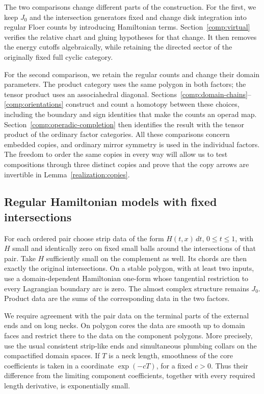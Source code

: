 The two comparisons change different parts of the construction.
For the first, we keep $J_0$ and the intersection generators fixed
and change disk integration into regular Floer counts by introducing
Hamiltonian terms.  Section~\ref{comp:virtual} verifies the relative
chart and gluing hypotheses for that change.  It then removes the
energy cutoffs algebraically, while retaining the directed sector
of the originally fixed full cyclic category.

For the second comparison, we retain the regular counts and change
their domain parameters.  The product category uses the same polygon
in both factors; the tensor product uses an associahedral diagonal.
Sections~\ref{comp:domain-chains}--\ref{comp:orientations} construct
and count a homotopy between these choices, including the boundary
and sign identities that make the counts an operad map.
Section~\ref{comp:operadic-completion} then identifies the result with
the tensor product of the ordinary factor categories.  All these
comparisons concern embedded copies, and ordinary mirror symmetry
is used in the individual factors.  The freedom to order the same
copies in every way will allow us to test compositions through three
distinct copies and prove that the copy arrows are invertible in
Lemma~\ref{realization:copies}.

\subsection{Regular Hamiltonian models with fixed intersections}
\label{comp:regular-models}

For each ordered pair choose strip data of the form $H(t,x)\,dt$,
$0\leq t\leq1$, with $H$ small and identically zero on fixed small
balls around the intersections of that pair.  Take $H$ sufficiently
small on the complement as well.  Its chords are then exactly the
original intersections.  On a stable polygon, with at least two
inputs, use a domain-dependent Hamiltonian one-form whose tangential
restriction to every Lagrangian boundary arc is zero.  The almost
complex structure remains $J_0$.  Product data are the sums of the
corresponding data in the two factors.

We require agreement with the pair data on the terminal parts of the
external ends and on long necks.  On polygon cores the data are smooth
up to domain faces and restrict there to the data on the component
polygons.  More precisely, use the usual consistent strip-like ends
and simultaneous plumbing collars on the compactified domain spaces.
If $T$ is a neck length, smoothness of the core coefficients is taken
in a coordinate $\exp(-cT)$, for a fixed $c>0$.  Thus their difference
from the limiting component coefficients, together with every
required length derivative, is exponentially small.


